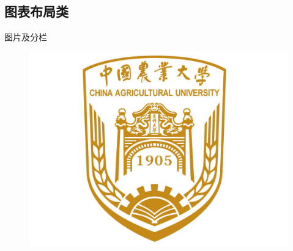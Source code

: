 \documentclass{CAUBeamer}
\begin{document}
\subsection{图表布局类}
\begin{frame}{图片及分栏}
    \begin{minipage}[c]{0.3\linewidth}
        \medskip
        \begin{figure}[h]
            \centering
            \includegraphics[height=.4\textheight]{pic/CAUlogo.png}
        \end{figure}
    \end{minipage}\hspace{1cm}
    \begin{minipage}{0.5\linewidth}
        \medskip
        \begin{figure}[h]
            \centering

\end{figure}
\end{minipage}
\end{frame}
\end{document}
